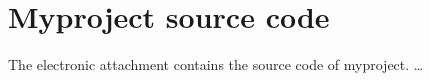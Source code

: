 \chapter{Myproject source code}\label{app:code}

The electronic attachment contains the source code of myproject. \ldots
